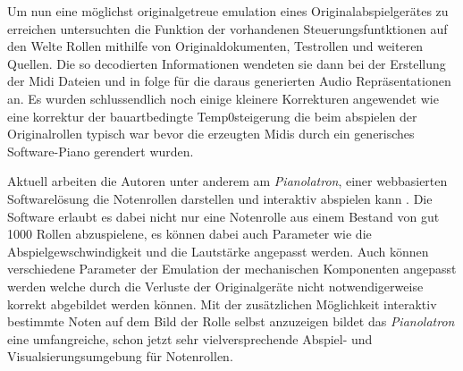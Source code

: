 Um nun eine möglichst originalgetreue emulation eines Originalabspielgerätes zu erreichen untersuchten \autocite[521f]{shi_2019} die Funktion der vorhandenen Steuerungsfuntktionen auf den Welte Rollen mithilfe von Originaldokumenten, Testrollen und weiteren Quellen.
Die so decodierten Informationen wendeten sie dann bei der Erstellung der Midi Dateien und in folge für die daraus generierten Audio Repräsentationen an.
Es wurden schlussendlich noch einige kleinere Korrekturen angewendet wie eine korrektur der bauartbedingte Temp0steigerung die beim abspielen der Originalrollen typisch war bevor die erzeugten Midis durch ein generisches Software-Piano gerendert wurden.

Aktuell arbeiten die Autoren unter anderem am \textit{Pianolatron}, einer webbasierten Softwarelösung die Notenrollen darstellen und interaktiv abspielen kann \parencite[]{vijoy_2022}.
Die Software erlaubt es dabei nicht nur eine Notenrolle aus einem Bestand von gut 1000 Rollen abzuspielene, es können dabei auch Parameter wie die Abspielgewschwindigkeit und die Lautstärke angepasst werden.
Auch können verschiedene Parameter der Emulation der mechanischen Komponenten angepasst werden welche durch die Verluste der Originalgeräte nicht notwendigerweise korrekt abgebildet werden können.
Mit der zusätzlichen Möglichkeit interaktiv bestimmte Noten auf dem Bild der Rolle selbst anzuzeigen bildet das \textit{Pianolatron} eine umfangreiche, schon jetzt sehr vielversprechende Abspiel- und Visualsierungsumgebung für Notenrollen. 

